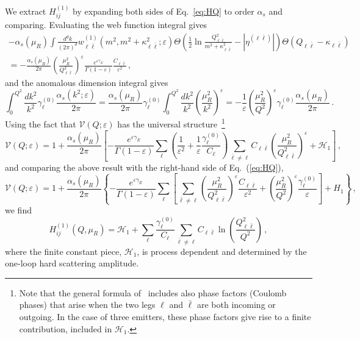 We extract $H_{ij}^{(1)}$ by expanding both sides of
Eq.~\eqref{eq:HQ} to order $\alpha_s$ and comparing.
Evaluating the web function integral gives
\begin{multline}
  \label{eq:w-exp}
  -\alpha_s(\mu_R)  \int \frac{d^dk}{(2\pi)^d} w^{(1)}_{\ell \bar \ell}(m^2,m^2+\kappa_{\ell\bar \ell}^2;\varepsilon) \Theta\left(\frac 12\ln\frac{Q^2_{\ell\bar \ell}}{m^2+\kappa_{\ell\bar \ell}^2}-|\eta^{(\ell\bar \ell)}| \right) \Theta(Q_{\ell \bar\ell}-\kappa_{\ell\bar \ell}) \\ = -\frac{\alpha_s(\mu_R)}{2\pi}
  \left(\frac{\mu_R^2}{Q^2_{\ell\bar \ell}}\right)^\varepsilon \frac{e^{\varepsilon\gamma_E}}{\Gamma(1-\varepsilon)} \frac{C_{\ell\bar \ell}}{\varepsilon^2}\,,
\end{multline}
and the anomalous dimension integral gives
\begin{equation}
  \label{eq:gamma0-int}
  \int_0^{Q^2}\!\!\frac{dk^2}{k^2}\gamma_\ell^{(0)}\frac{\alpha_s(k^2;\varepsilon)}{2\pi} = \frac{\alpha_s(\mu_R)}{2\pi}\gamma_\ell^{(0)} \int_0^{Q^2}\!\!\frac{dk^2}{k^2}\left(\frac{\mu_R^2}{k^2}\right)^{\varepsilon} = -\frac{1}{\varepsilon}\left(\frac{\mu_R^2}{Q^2}\right)^{\varepsilon} \gamma_\ell^{(0)}\frac{\alpha_s(\mu_R)}{2\pi}\,.
\end{equation}
Using the fact that $\mathcal{V}(Q;\varepsilon)$ has the universal structure~\cite{Catani:1998bh}\footnote{Note that the general formula of~\cite{Catani:1998bh} includes also phase factors (Coulomb phases) that arise when the two legs $\ell$ and $\bar \ell$ are both incoming or outgoing. In the case of three emitters, these phase factors give rise to a finite contribution, included in $\mathcal{H}_1$.}
\begin{equation}
  \label{eq:HQ-expanded}
  \mathcal{V}(Q;\varepsilon) = 1+\frac{\alpha_s(\mu_R)}{2\pi}\left[-\frac{e^{\varepsilon\gamma_E}}{\Gamma(1-\varepsilon)}\sum_\ell\left(\frac{1}{\varepsilon^2}+\frac{1}{\varepsilon}\frac{\gamma_\ell^{(0)}}{C_\ell}\right)\sum_{\bar \ell\ne \ell} C_{\ell\bar\ell}\left(\frac{\mu_R^2}{Q_{\ell\bar \ell}^2}\right)^{\varepsilon}+\mathcal{H}_1\right]\,,
\end{equation}
and comparing the above result with the right-hand side of Eq.~(\ref{eq:HQ}),
\begin{equation}
  \label{eq:HQ-rep-expanded}
  \mathcal{V}(Q;\varepsilon) = 1+\frac{\alpha_s(\mu_R)}{2\pi}\left\{-\frac{e^{\varepsilon\gamma_E}}{\Gamma(1-\varepsilon)}\sum_\ell\left[\sum_{\bar \ell\ne \ell}\left(\frac{\mu_R^2}{Q^2_{\ell\bar\ell}}\right)^{\varepsilon}\frac{C_{\ell\bar \ell}}{\varepsilon^2}+\left(\frac{\mu_R^2}{Q^2}\right)^{\varepsilon}\frac{\gamma_\ell^{(0)}}{\varepsilon}\right]+H_1\right\}\,,
\end{equation}
we find
\begin{equation}
  \label{eq:H1-final}
  H_{ij}^{(1)}(Q,\mu_R) = \mathcal{H}_1+ \sum_\ell\frac{\gamma_\ell^{(0)}}{C_\ell}\sum_{\bar \ell\ne \ell} C_{\ell\bar \ell}\ln\left(\frac{Q^2_{\ell\bar\ell}}{Q^2}\right)\,,
\end{equation}
where the finite constant piece, $\mathcal{H}_1$, is
process dependent and determined by the one-loop hard scattering
amplitude.

